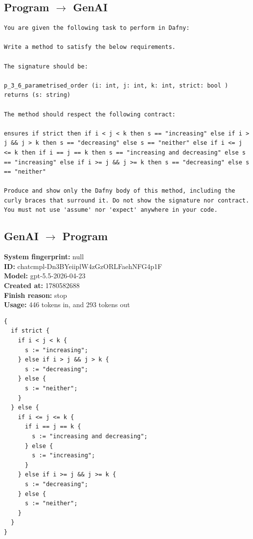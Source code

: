\documentclass{article}
\begin{document}
\subsection*{Program $\rightarrow$ GenAI}
\begin{lstlisting}
You are given the following task to perform in Dafny:

Write a method to satisfy the below requirements.

The signature should be:

p_3_6_parametrised_order (i: int, j: int, k: int, strict: bool ) returns (s: string)

The method should respect the following contract:

ensures if strict then if i < j < k then s == "increasing" else if i > j && j > k then s == "decreasing" else s == "neither" else if i <= j <= k then if i == j == k then s == "increasing and decreasing" else s == "increasing" else if i >= j && j >= k then s == "decreasing" else s == "neither"

Produce and show only the Dafny body of this method, including the curly braces that surround it. Do not show the signature nor contract. You must not use 'assume' nor 'expect' anywhere in your code.
\end{lstlisting}
\subsection*{GenAI $\rightarrow$ Program}
\textbf{System fingerprint: }null
\\\textbf{ID: }chatcmpl-Dn3BYeiiplW4zGzORLFaehNFG4p1F
\\\textbf{Model: }gpt-5.5-2026-04-23
\\\textbf{Created at: }1780582688
\\\textbf{Finish reason: }stop
\\\textbf{Usage: }446 tokens in, and 293 tokens out
\begin{lstlisting}
{
  if strict {
    if i < j < k {
      s := "increasing";
    } else if i > j && j > k {
      s := "decreasing";
    } else {
      s := "neither";
    }
  } else {
    if i <= j <= k {
      if i == j == k {
        s := "increasing and decreasing";
      } else {
        s := "increasing";
      }
    } else if i >= j && j >= k {
      s := "decreasing";
    } else {
      s := "neither";
    }
  }
}
\end{lstlisting}
\end{document}
